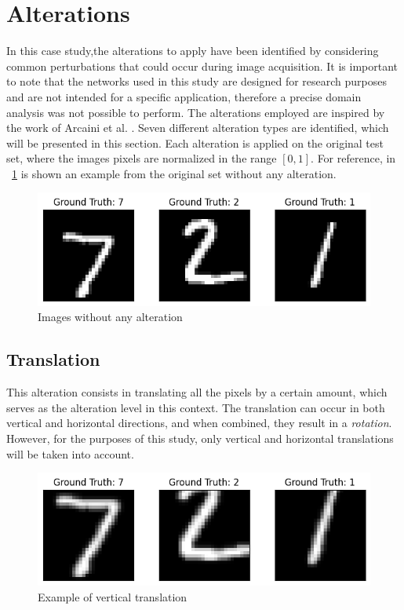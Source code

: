 \section{Alterations}

In this case study,the alterations to apply have been identified by considering common perturbations that could occur during image acquisition. It is important to note that the networks used in this study are designed for research purposes and are not intended for a specific application, therefore a precise domain analysis was not possible to perform. The alterations employed are inspired by the work of Arcaini et al. \cite{9176802}. Seven different alteration types are identified, which will be presented in this section. Each alteration is applied on the original test set, where the images pixels are normalized in the range $[0,1]$. For reference, in \Fig~\ref{fig:orig} is shown an example from the original set without any alteration.

\begin{figure}[h]
	\centering
	\includegraphics[width=0.6\linewidth]{ImageFiles/Alterations/orig}
	\caption{Images without any alteration}
	\label{fig:orig}
\end{figure}

\subsection{Translation}

This alteration consists in translating all the pixels by a certain amount, which serves as the alteration level in this context. The translation can occur in both vertical and horizontal directions, and when combined, they result in a \textit{rotation}. However, for the purposes of this study, only vertical and horizontal translations will be taken into account.

\begin{figure}[h]
	\centering
	\includegraphics[width=0.6\linewidth]{ImageFiles/Alterations/VT}
	\caption{Example of vertical translation}
	\label{fig:VT}
\end{figure}

